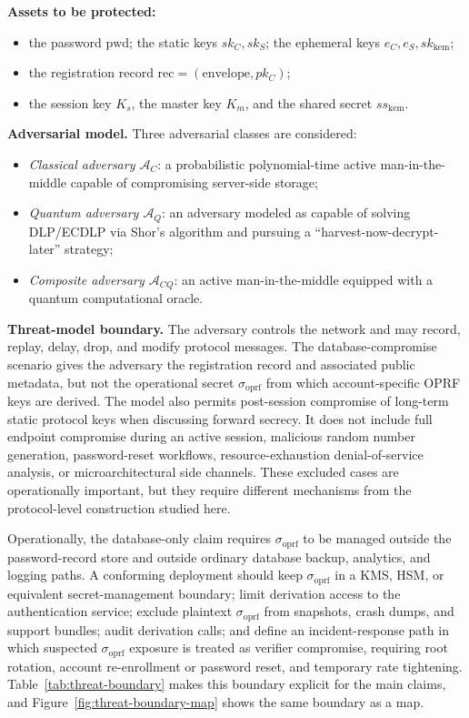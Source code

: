 \documentclass[preprint,12pt]{elsarticle}
\newcommand{\sigoprf}{\sigma_{\mathrm{oprf}}}
\theoremstyle{remark}
\begin{document}
\textbf{Assets to be protected:}
\begin{itemize}
  \item the password $\mathrm{pwd}$; the static keys $sk_C, sk_S$; the
        ephemeral keys $e_C, e_S, sk_{\mathrm{kem}}$;
  \item the registration record
        $\mathrm{rec} = (\mathrm{envelope}, pk_C)$;
  \item the session key $K_s$, the master key $K_m$, and the shared
        secret $ss_{\mathrm{kem}}$.
\end{itemize}

\textbf{Adversarial model.} Three adversarial classes are considered:
\begin{itemize}
  \item \emph{Classical adversary $\mathcal{A}_C$}: a
        probabilistic polynomial-time active man-in-the-middle capable
        of compromising server-side storage;
  \item \emph{Quantum adversary $\mathcal{A}_Q$}: an adversary modeled
        as capable of solving DLP/ECDLP via Shor's algorithm and pursuing a
        ``harvest-now-decrypt-later'' strategy;
  \item \emph{Composite adversary $\mathcal{A}_{CQ}$}: an active
        man-in-the-middle equipped with a quantum computational oracle.
\end{itemize}

\textbf{Threat-model boundary.} The adversary controls the network and
may record, replay, delay, drop, and modify protocol messages. The
database-compromise scenario gives the adversary the registration
record and associated public metadata, but not the operational secret
$\sigoprf$ from which account-specific OPRF keys are derived. The model
also permits post-session compromise of long-term static protocol keys
when discussing forward secrecy. It does not include
full endpoint compromise during an active session, malicious random
number generation, password-reset workflows, resource-exhaustion
denial-of-service analysis, or microarchitectural side channels. These
excluded cases are operationally important, but they require different
mechanisms from the protocol-level construction studied here.

Operationally, the database-only claim requires $\sigoprf$ to be managed
outside the password-record store and outside ordinary database backup,
analytics, and logging paths. A conforming deployment should keep
$\sigoprf$ in a KMS, HSM, or equivalent secret-management boundary;
limit derivation access to the authentication service; exclude plaintext
$\sigoprf$ from snapshots, crash dumps, and support bundles; audit
derivation calls; and define an incident-response path in which suspected
$\sigoprf$ exposure is treated as verifier compromise, requiring root
rotation, account re-enrollment or password reset, and temporary rate
tightening.
Table~\ref{tab:threat-boundary} makes this boundary explicit for the
main claims, and Figure~\ref{fig:threat-boundary-map} shows the same
boundary as a map.
\end{document}
